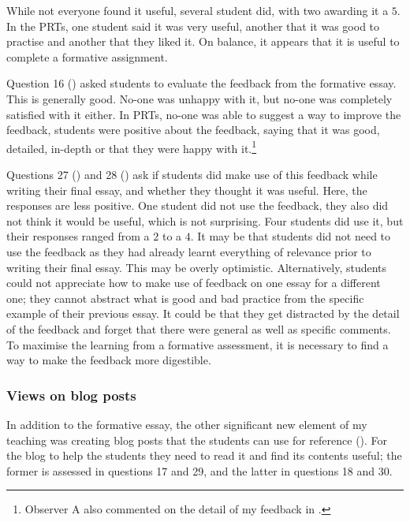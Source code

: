 While not everyone found it useful, several student did, with two awarding it a $5$. In the PRTs, one student said it was very useful, another that it was good to practise and another that they liked it. On balance, it appears that it is useful to complete a formative assignment.

Question 16 () asked students to evaluate the feedback from the formative essay. This is generally good. No-one was unhappy with it, but no-one was completely satisfied with it either. In PRTs, no-one was able to suggest a way to improve the feedback, students were positive about the feedback, saying that it was good, detailed, in-depth or that they were happy with it.\footnote{Observer A also commented on the detail of my feedback in .}

Questions 27 () and 28 () ask if students did make use of this feedback while writing their final essay, and whether they thought it was useful. Here, the responses are less positive. One student did not use the feedback, they also did not think it would be useful, which is not surprising. Four students did use it, but their responses ranged from a $2$ to a $4$. It may be that students did not need to use the feedback as they had already learnt everything of relevance prior to writing their final essay. This may be overly optimistic. Alternatively, students could not appreciate how to make use of feedback on one essay for a different one; they cannot abstract what is good and bad practice from the specific example of their previous essay. It could be that they get distracted by the detail of the feedback and forget that there were general as well as specific comments. To maximise the learning from a formative assessment, it is necessary to find a way to make the feedback more digestible. 

\subsubsection{Views on blog posts}\label{sec:views-blog}

In addition to the formative essay, the other significant new element of my teaching was creating blog posts that the students can use for reference (). For the blog to help the students they need to read it and find its contents useful; the former is assessed in questions 17 and 29, and the latter in questions 18 and 30.


